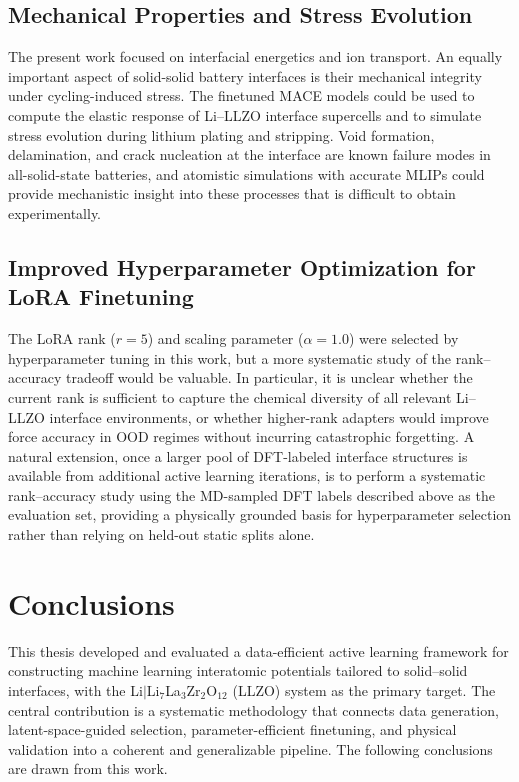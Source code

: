 \documentclass[12pt,a4paper,oneside]{book}
\begin{document}
\section{Mechanical Properties and Stress Evolution}

The present work focused on interfacial energetics and ion transport. An equally
important aspect of solid-solid battery interfaces is their mechanical integrity
under cycling-induced stress. The finetuned MACE models could be used to compute
the elastic response of Li--LLZO interface supercells and to simulate stress
evolution during lithium plating and stripping. Void formation, delamination, and
crack nucleation at the interface are known failure modes in all-solid-state batteries,
and atomistic simulations with accurate MLIPs could provide mechanistic insight into
these processes that is difficult to obtain experimentally.

\section{Improved Hyperparameter Optimization for \texorpdfstring{\\}{ } LoRA Finetuning}

The LoRA rank ($r = 5$) and scaling parameter ($\alpha = 1.0$) were selected by
hyperparameter tuning in this work, but a more systematic study of the rank--accuracy
tradeoff would be valuable. In particular, it is unclear whether the current rank
is sufficient to capture the chemical diversity of all relevant Li--LLZO interface
environments, or whether higher-rank adapters would improve force accuracy in
OOD regimes without incurring catastrophic forgetting. A natural extension, once a larger pool of DFT-labeled interface structures
is available from additional active learning iterations, is to perform a
systematic rank--accuracy study using the MD-sampled DFT labels described
above as the evaluation set, providing a physically grounded basis for
hyperparameter selection rather than relying on held-out static splits alone.


\chapter{Conclusions}

This thesis developed and evaluated a data-efficient active learning framework for
constructing machine learning interatomic potentials tailored to solid--solid
interfaces, with the Li$|$Li$_7$La$_3$Zr$_2$O$_{12}$ (LLZO) system as the primary
target. The central contribution is a systematic methodology that connects data
generation, latent-space-guided selection, parameter-efficient finetuning, and
physical validation into a coherent and generalizable pipeline. The following
conclusions are drawn from this work.
\end{document}
